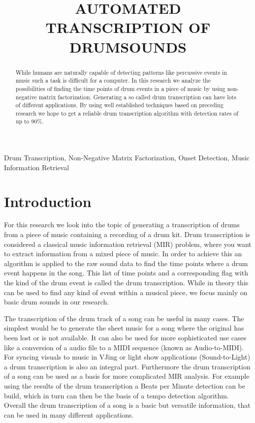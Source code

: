 \documentclass{article}
\title{AUTOMATED TRANSCRIPTION OF DRUMSOUNDS}
\begin{document}
%
\maketitle
%
\begin{abstract}
While humans are naturally capable of detecting patterns like percussive events in music such a task is difficult for a computer.
In this research we analyze the possibilities of finding the time points of drum events in a piece of music by using non-negative matrix factorization.
Generating a so called drum transcription can have lots of different applications.
By using well established techniques based on preceding research we hope to get a reliable drum transcription algorithm with detection rates of up to 90\%.

\end{abstract}
%
\begin{keywords}
Drum Transcription, Non-Negative Matrix Factorization, Onset Detection, Music Information Retrieval
\end{keywords}
%
\section{Introduction}
\label{sec:intro}

For this research we look into the topic of generating a transcription of drums from a piece of music containing a recording of a drum kit.
Drum transcription is considered a classical music information retrieval (MIR) problem, where you want to extract information from a mixed piece of music.
In order to achieve this an algorithm is applied to the raw sound data to find the time points where a drum event happens in the song.
This list of time points and a corresponding flag with the kind of the drum event is called the drum transcription. 
While in theory this can be used to find any kind of event within a musical piece, we focus mainly on basic drum sounds in our research.

The transcription of the drum track of a song can be useful in many cases.
The simplest would be to generate the sheet music for a song where the original has been lost or is not available.
It can also be used for more sophisticated use cases like a conversion of a audio file to a MIDI sequence (known as Audio-to-MIDI).
For syncing visuals to music in VJing or light show applications (Sound-to-Light) a drum transcription is also an integral part.
Furthermore the drum transcription of a song can be used as a basis for more complicated MIR analysis.
For example using the results of the drum transcription a Beats per Minute detection can be build, which in turn can then be the basis of a tempo detection algorithm.
Overall the drum transcription of a song is a basic but versatile information, that can be used in many different applications.
\end{document}
